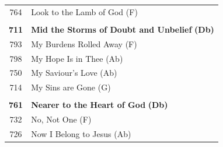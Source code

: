 \begin{small}
\begin{supertabular}{c l}
764 & Look to the Lamb of God (F) \\
 & \\
\textbf{711} & \textbf{Mid the Storms of Doubt and Unbelief} \textbf{(Db)} \\
793 & My Burdens Rolled Away (F) \\
798 & My Hope Is in Thee (Ab) \\
750 & My Saviour’s Love (Ab) \\
714 & My Sins are Gone (G) \\
 & \\
\textbf{761} & \textbf{Nearer to the Heart of God} \textbf{(Db)} \\
732 & No, Not One (F) \\
726 & Now I Belong to Jesus (Ab) \\


\end{supertabular}
\end{small}
